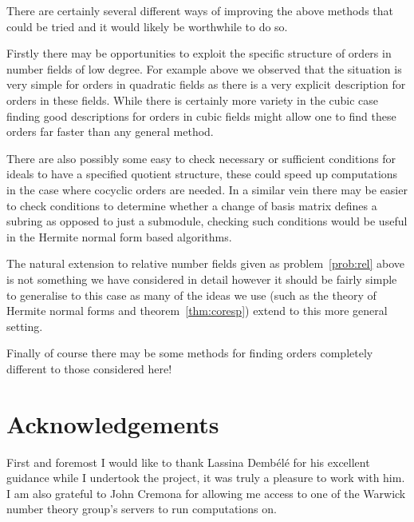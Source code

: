 \documentclass[12pt,a4paper,abstracton,bibtotoc]{scrreprt}
\theoremstyle{definition}
\begin{document}
There are certainly several different ways of improving the above methods that could be tried and it would likely be worthwhile to do so.

Firstly there may be opportunities to exploit the specific structure of orders in number fields of low degree.
For example above we observed that the situation is very simple for orders in quadratic fields as there is a very explicit description for orders in these fields.
While there is certainly more variety in the cubic case finding good descriptions for orders in cubic fields might allow one to find these orders far faster than any general method.

There are also possibly some easy to check necessary or sufficient conditions for ideals to have a specified quotient structure, these could speed up computations in the case where cocyclic orders are needed.
In a similar vein there may be easier to check conditions to determine whether a change of basis matrix defines a subring as opposed to just a submodule, checking such conditions would be useful in the Hermite normal form based algorithms.

The natural extension to relative number fields given as problem~\ref{prob:rel} above is not something we have considered in detail however it should be fairly simple to generalise to this case as many of the ideas we use (such as the theory of Hermite normal forms and theorem~\ref{thm:coresp}) extend to this more general setting.

Finally of course there may be some methods for finding orders completely different to those considered here!

\section{Acknowledgements}
First and foremost I would like to thank Lassina Demb\'el\'e for his excellent guidance while I undertook the project, it was truly a pleasure to work with him.
I am also grateful to John Cremona for allowing me access to one of the Warwick number theory group's servers to run computations on.


 
%

%

\nocite{*}


\end{document}
